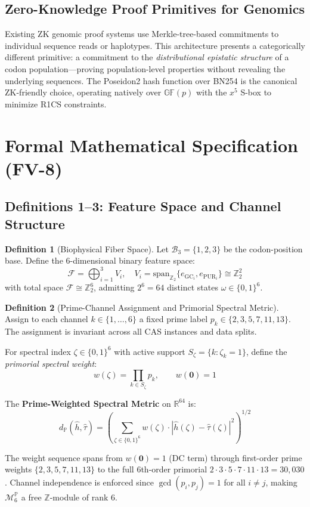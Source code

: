 \documentclass[12pt,letterpaper]{article}
\theoremstyle{definition}
\newtheorem{definition}{Definition}[section]
\theoremstyle{plain}
\theoremstyle{remark}
\newcommand{\dP}{d_{\mathbb{P}}}
\newcommand{\hhat}{\hat{h}}
\newcommand{\GFp}{\mathbb{GF}(p)}
\begin{document}
\subsection{Zero-Knowledge Proof Primitives for Genomics}

Existing ZK genomic proof systems use Merkle-tree-based commitments to individual sequence reads or haplotypes. This architecture presents a categorically different primitive: a commitment to the \emph{distributional epistatic structure} of a codon population---proving population-level properties without revealing the underlying sequences. The Poseidon2 hash function over BN254 is the canonical ZK-friendly choice, operating natively over $\GFp$ with the $x^5$ S-box to minimize R1CS constraints.

\section{Formal Mathematical Specification (FV-8)}

\subsection{Definitions 1--3: Feature Space and Channel Structure}

\begin{definition}[Biophysical Fiber Space]
Let $\mathcal{B}_3 = \{1,2,3\}$ be the codon-position base. Define the 6-dimensional binary feature space:
\[
  \mathcal{F} = \bigoplus_{i=1}^{3} V_i, \quad V_i = \mathrm{span}_{\mathbb{Z}_2}\{e_{\mathrm{GC}_i}, e_{\mathrm{PUR}_i}\} \cong \mathbb{Z}_2^2
\]
with total space $\mathcal{F} \cong \mathbb{Z}_2^6$, admitting $2^6 = 64$ distinct states $\omega \in \{0,1\}^6$.
\end{definition}

\begin{definition}[Prime-Channel Assignment and Primorial Spectral Metric]
Assign to each channel $k \in \{1,\ldots,6\}$ a fixed prime label $p_k \in \{2,3,5,7,11,13\}$. The assignment is invariant across all CAS instances and data splits.

For spectral index $\zeta \in \{0,1\}^6$ with active support $S_\zeta = \{k : \zeta_k = 1\}$, define the \emph{primorial spectral weight}:
\[
  w(\zeta) = \prod_{k \in S_\zeta} p_k, \qquad w(\mathbf{0}) = 1
\]

The \textbf{Prime-Weighted Spectral Metric} on $\mathbb{R}^{64}$ is:
\[
  \dP(\hhat, \hat{\tau}) = \left( \sum_{\zeta \in \{0,1\}^6} w(\zeta)\cdot|\hhat(\zeta) - \hat{\tau}(\zeta)|^2 \right)^{1/2}
\]

The weight sequence spans from $w(\mathbf{0}) = 1$ (DC term) through first-order prime weights $\{2,3,5,7,11,13\}$ to the full 6th-order primorial $2\cdot3\cdot5\cdot7\cdot11\cdot13 = 30{,}030$. Channel independence is enforced since $\gcd(p_i, p_j) = 1$ for all $i \neq j$, making $\mathcal{M}_6^{\mathbb{P}}$ a free $\mathbb{Z}$-module of rank 6.
\end{definition}
\end{document}
